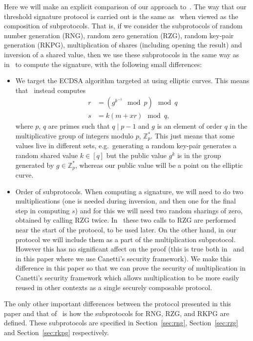 \documentclass{article}
\newcommand\paper{paper}
\newcommand{\seq}[1]{\left[#1\right]}
\theoremstyle{remark}
\begin{document}
Here we will make an explicit comparison of our approach to~\cite{gjkr96}. The
way that our threshold signature protocol is carried out is the same
as~\cite{gjkr96} when viewed as the composition of subprotocols. That is, if we
consider the subprotocols of random number generation (RNG), random zero
generation (RZG), random key-pair generation (RKPG), multiplication of shares
(including opening the result) and inversion of a shared value, then we use
these subprotocols in the same way as in~\cite{gjkr96} to compute the
signature, with the following small differences:
\begin{itemize}
	\item We target the ECDSA algorithm targeted at using elliptic curves. This
		means that~\cite{gjkr96} instead computes
		\begin{align*}
			r &= \left(g^{k^{-1}} \mod p\right) \mod q\\
			s & = k(m + xr) \mod q,
		\end{align*}
		where $p$, $q$ are primes such that $q \mid p - 1$ and $g$ is an
		element of order $q$ in the multiplicative group of integers modulo
		$p$, $\mathbb{Z}_p^\ast$. This just means that some values live in
		different sets, e.g.\ generating a random key-pair generates a random
		shared value $k \in \seq{q}$ but the public value $g^k$ is in the group
		generated by $g \in \mathbb{Z}_p^\ast$, whereas our public value will
		be a point on the elliptic curve.
	\item Order of subprotocols. When computing a signature, we will need to do
		two multiplications (one is needed during inversion, and then one for
		the final step in computing $s$) and for this we will need two random
		sharings of zero, obtained by calling RZG twice.  In~\cite{gjkr96}
		these two calls to RZG are performed near the start of the protocol, to
		be used later. On the other hand, in our protocol we will include them
		as a part of the multiplication subprotocol. However this has no
		significant affect on the proof (this is true both in~\cite{gjkr96} and
		in this \paper{} where we use Canetti's security framework). We make
		this difference in this \paper{} so that we can prove the security of
		multiplication in Canetti's security framework which allows
		multiplication to be more easily reused in other contexts as a single
		securely composable protocol.
\end{itemize}

The only other important differences between the protocol presented in this
\paper{} and that of~\cite{gjkr96} is how the subprotocols for RNG, RZG, and
RKPG are defined. These subprotocols are specified in Section~\ref{sec:rng},
Section~\ref{sec:rzg} and Section~\ref{sec:rkpg} respectively.
\end{document}
